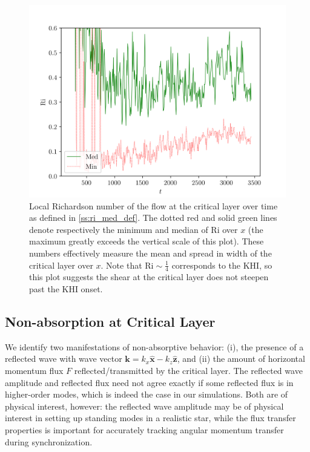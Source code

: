 \documentclass[
        fleqn,
        usenatbib,
    ]{mnras}
\newcommand*{\bm}[1]{\boldsymbol{\mathbf{#1}}}
\newcommand*{\uv}[1]{\hat{\boldsymbol{\mathbf{#1}}}}
\begin{document}
\begin{figure}
    \centering
    \includegraphics[width=\columnwidth]{plots/nl_f_ri.png}
    \caption{Local Richardson number of the flow at the critical layer over time
    as defined in \autoref{ss:ri_med_def}. The dotted red and solid green lines
    denote respectively the minimum and median of $\mathrm{Ri}$ over $x$ (the
    maximum greatly exceeds the vertical scale of this plot). These numbers
    effectively measure the mean and spread in width of the critical layer over
    $x$. Note that $\mathrm{Ri} \sim \frac{1}{4}$ corresponds to the KHI, so
    this plot suggests the shear at the critical layer does not steepen past the
    KHI onset.}\label{fig:nl_f_ri}
\end{figure}

\subsection{Non-absorption at Critical Layer}\label{ss:reflectivity}

We identify two manifestations of non-absorptive behavior: (i), the presence of
a reflected wave with wave vector $\bm{k} = k_{x}\uv{x} - k_{z}\uv{z}$, and (ii)
the amount of horizontal momentum flux $F$ reflected/transmitted by the critical
layer. The reflected wave amplitude and reflected flux need not agree exactly if
some reflected flux is in higher-order modes, which is indeed the case in our
simulations. Both are of physical interest, however: the reflected wave
amplitude may be of physical interest in setting up standing modes in a
realistic star, while the flux transfer properties is important for accurately
tracking angular momentum transfer during synchronization.
\end{document}

